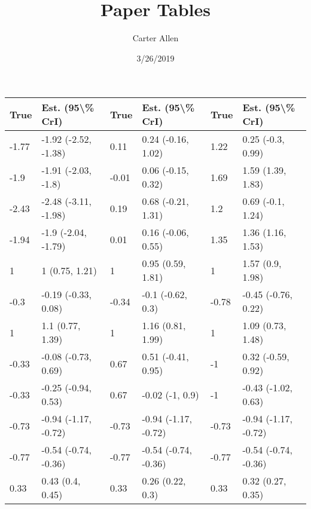 \documentclass[]{article}
\title{Paper Tables}
\author{Carter Allen}
\date{3/26/2019}
\begin{document}
\maketitle

\begin{tabular}{l|l|l|l|l|l}
\hline
True & Est. (95\textbackslash{}\% CrI) & True & Est. (95\textbackslash{}\% CrI) & True & Est. (95\textbackslash{}\% CrI)\\
\hline
-1.77 & -1.92 (-2.52, -1.38) & 0.11 & 0.24 (-0.16, 1.02) & 1.22 & 0.25 (-0.3, 0.99)\\
\hline
-1.9 & -1.91 (-2.03, -1.8) & -0.01 & 0.06 (-0.15, 0.32) & 1.69 & 1.59 (1.39, 1.83)\\
\hline
-2.43 & -2.48 (-3.11, -1.98) & 0.19 & 0.68 (-0.21, 1.31) & 1.2 & 0.69 (-0.1, 1.24)\\
\hline
-1.94 & -1.9 (-2.04, -1.79) & 0.01 & 0.16 (-0.06, 0.55) & 1.35 & 1.36 (1.16, 1.53)\\
\hline
1 & 1 (0.75, 1.21) & 1 & 0.95 (0.59, 1.81) & 1 & 1.57 (0.9, 1.98)\\
\hline
-0.3 & -0.19 (-0.33, 0.08) & -0.34 & -0.1 (-0.62, 0.3) & -0.78 & -0.45 (-0.76, 0.22)\\
\hline
1 & 1.1 (0.77, 1.39) & 1 & 1.16 (0.81, 1.99) & 1 & 1.09 (0.73, 1.48)\\
\hline
-0.33 & -0.08 (-0.73, 0.69) & 0.67 & 0.51 (-0.41, 0.95) & -1 & 0.32 (-0.59, 0.92)\\
\hline
-0.33 & -0.25 (-0.94, 0.53) & 0.67 & -0.02 (-1, 0.9) & -1 & -0.43 (-1.02, 0.63)\\
\hline
-0.73 & -0.94 (-1.17, -0.72) & -0.73 & -0.94 (-1.17, -0.72) & -0.73 & -0.94 (-1.17, -0.72)\\
\hline
-0.77 & -0.54 (-0.74, -0.36) & -0.77 & -0.54 (-0.74, -0.36) & -0.77 & -0.54 (-0.74, -0.36)\\
\hline
0.33 & 0.43 (0.4, 0.45) & 0.33 & 0.26 (0.22, 0.3) & 0.33 & 0.32 (0.27, 0.35)\\
\hline
\end{tabular}
\end{document}
